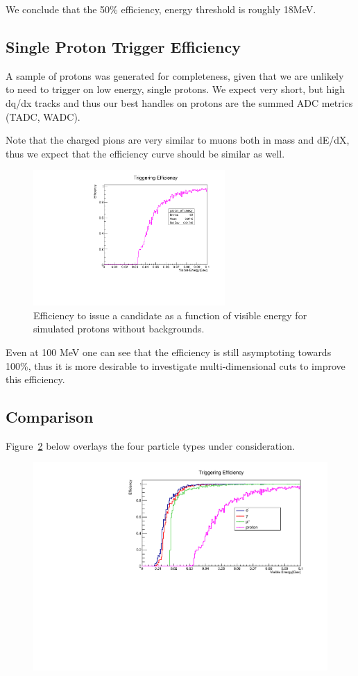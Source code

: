 \documentclass[10pt]{article}
\begin{document}
We conclude that the 50\% efficiency, energy threshold is roughly 18MeV. 

\subsection{Single Proton Trigger Efficiency}

A sample of protons was generated for completeness, given that we are unlikely to need to trigger on low energy, single protons. 
We expect very short, but high dq/dx tracks and thus our best handles on protons are the summed ADC metrics (TADC, WADC). 

Note that the charged pions are very similar to muons both in mass and dE/dX, thus we expect that the efficiency curve should be similar as well. 

\begin{figure}[H]
    \centering
    \includegraphics[angle=270,width=0.65\textwidth]{UpdatedEff/SingleParticle/proton_efficiency.pdf}
    \caption{Efficiency to issue a candidate as a function of visible energy for simulated protons without backgrounds.}
    \label{fig:eff_proton}
\end{figure}

Even at 100 MeV one can see that the efficiency is still asymptoting towards 100\%, thus it is more desirable to investigate multi-dimensional cuts to improve this efficiency. 


\subsection{Comparison}

Figure~\ref{fig:comparison} below overlays the four particle types under consideration.

\begin{figure}[H]
    \centering
    \includegraphics[angle=270,width=\textwidth]{UpdatedEff/SingleParticle//efficiency_comparison_mu_e_gamma_proton_2.pdf}
    \label{fig:comparison}
\end{figure}
\end{document}
